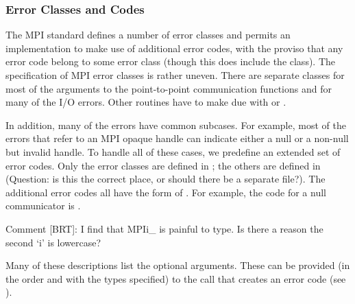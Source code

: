 %
\subsubsection{Error Classes and Codes}
The MPI standard defines a number of error classes and permits an
implementation to make use of additional error codes, with the proviso that
any error code belong to some error class (though this does include the
 class).  
The specification of MPI error classes is rather uneven.  There are separate
classes for most of the arguments to the point-to-point communication
functions and for many of the I/O errors.  Other routines have to make due
with  or .

In addition, many of the errors have common subcases.  For example, most of
the errors that refer to an MPI opaque handle can indicate either a null or a
non-null but invalid handle.   To handle all of these cases, we predefine an
extended set of error codes.  Only the error classes are defined in
; the others are defined in  (Question: is this
the correct place, or should there be a separate file?).  The additional error
codes all have the form of .  For example,
the code for a null communicator is .

Comment [BRT]: I find that MPIi_ is painful to type.  Is there a
reason the second `i' is lowercase?

Many of these descriptions list the optional arguments.  These can be provided
(in the order and with the types specified) to the call that creates an error
code (see ). 

